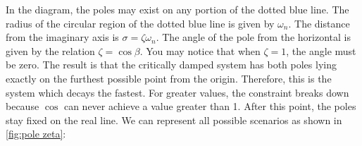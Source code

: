 In the diagram, the poles may exist on any portion of the dotted blue line. The radius of the circular region of the dotted blue line is given by $\omega_n$. The distance from the imaginary axis is $\sigma=\zeta\omega_n$. The angle of the pole from the horizontal is given by the relation $\zeta=\cos\beta$. You may notice that when $\zeta=1$, the angle must be zero. The result is that the critically damped system has both poles lying exactly on the furthest possible point from the origin. Therefore, this is the system which decays the fastest. For greater values, the constraint breaks down because $\cos$ can never achieve a value greater than 1. After this point, the poles stay fixed on the real line. We can represent all possible scenarios as shown in \autoref{fig:pole zeta}:
\begin{figure}[ht]
    \centering


\begin{tikzpicture}[x=0.75pt,y=0.75pt,yscale=-0.8,xscale=0.8]


\end{tikzpicture}
\end{figure}

